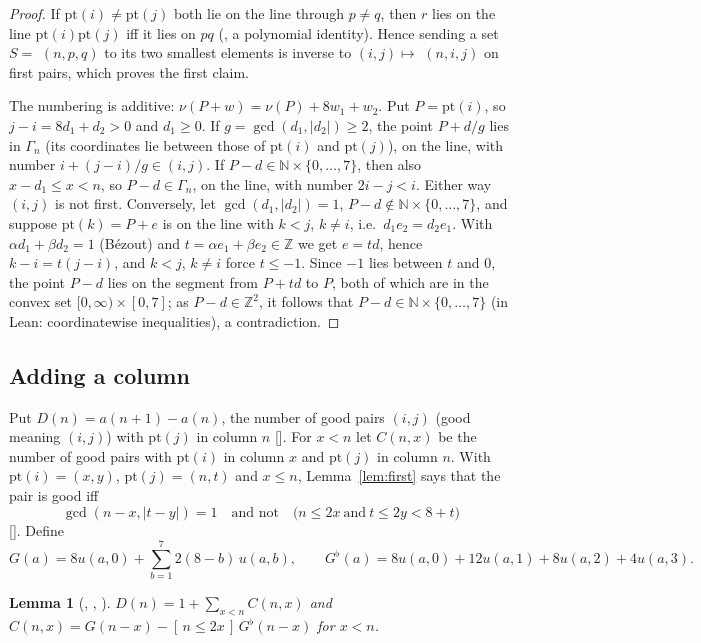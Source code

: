\documentclass[11pt]{amsart}
\theoremstyle{plain}
\newtheorem{lemma}[theorem]{Lemma}
\theoremstyle{definition}
\newcommand{\N}{\mathbb{N}}
\newcommand{\Z}{\mathbb{Z}}
\newcommand{\Gb}{G^{\flat}}
\newcommand{\ind}[1]{[\,#1\,]}
\begin{document}
\begin{proof}
If $\mathrm{pt}(i)\ne\mathrm{pt}(j)$ both lie on the line through $p\ne q$, then $r$ lies on the line $\mathrm{pt}(i)\mathrm{pt}(j)$ iff it lies on $pq$ (, a polynomial identity). Hence sending a set $S=$ $(n,p,q)$ to its two smallest elements is inverse to $(i,j)\mapsto$ $(n,i,j)$ on first pairs, which proves the first claim.

The numbering is additive: $\nu(P+w)=\nu(P)+8w_1+w_2$. Put $P=\mathrm{pt}(i)$, so $j-i=8d_1+d_2>0$ and $d_1\ge0$. If $g=\gcd(d_1,|d_2|)\ge2$, the point $P+d/g$ lies in $\Gamma_n$ (its coordinates lie between those of $\mathrm{pt}(i)$ and $\mathrm{pt}(j)$), on the line, with number $i+(j-i)/g\in(i,j)$. If $P-d\in\N\times\{0,\dots,7\}$, then also $x-d_1\le x<n$, so $P-d\in\Gamma_n$, on the line, with number $2i-j<i$. Either way $(i,j)$ is not first. Conversely, let $\gcd(d_1,|d_2|)=1$, $P-d\notin\N\times\{0,\dots,7\}$, and suppose $\mathrm{pt}(k)=P+e$ is on the line with $k<j$, $k\ne i$, i.e.\ $d_1e_2=d_2e_1$. With $\alpha d_1+\beta d_2=1$ (B\'ezout) and $t=\alpha e_1+\beta e_2\in\Z$ we get $e=td$, hence $k-i=t(j-i)$, and $k<j$, $k\ne i$ force $t\le-1$. Since $-1$ lies between $t$ and $0$, the point $P-d$ lies on the segment from $P+td$ to $P$, both of which are in the convex set $[0,\infty)\times[0,7]$; as $P-d\in\Z^2$, it follows that $P-d\in\N\times\{0,\dots,7\}$ (in Lean: coordinatewise inequalities), a contradiction.
\end{proof}

\subsection{Adding a column}
Put $D(n)=a(n+1)-a(n)$, the number of good pairs $(i,j)$ (good meaning $(i,j)$) with $\mathrm{pt}(j)$ in column $n$ []. For $x<n$ let $C(n,x)$ be the number of good pairs with $\mathrm{pt}(i)$ in column $x$ and $\mathrm{pt}(j)$ in column $n$. With $\mathrm{pt}(i)=(x,y)$, $\mathrm{pt}(j)=(n,t)$ and $x\le n$, Lemma~\ref{lem:first} says that the pair is good iff
\begin{equation}\label{eq:good}
\gcd(n-x,|t-y|)=1\quad\text{and not}\quad\bigl(n\le2x\ \text{and}\ t\le2y<8+t\bigr)
\end{equation}
[]. Define
\[
G(a)=8u(a,0)+\sum_{b=1}^{7}2(8-b)\,u(a,b),\qquad \Gb(a)=8u(a,0)+12u(a,1)+8u(a,2)+4u(a,3).
\]

\begin{lemma}[, , ]\label{lem:column}
$D(n)=1+\sum_{x<n}C(n,x)$ and $C(n,x)=G(n-x)-\ind{n\le2x}\,\Gb(n-x)$ for $x<n$.
\end{lemma}
\end{document}
